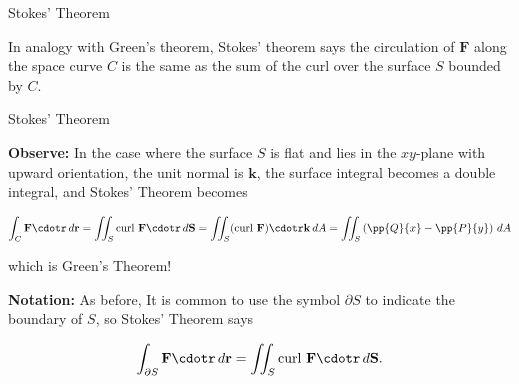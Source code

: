 \documentclass[11pt,english,
handout
]{beamer}
\begin{document}
\begin{frame}[t]{Stokes' Theorem}
\small

\pause 


%
%

\lspace
In analogy with Green's theorem, Stokes' theorem says the circulation of $\mathbf{F}$ along the space curve $C$ is the same as the sum of the curl over the surface $S$ bounded by $C$.
\end{frame}











\begin{frame}[t]{Stokes' Theorem}
\small

\textbf{Observe:} In the case where the surface $S$ is flat and lies in the $xy$-plane with upward orientation, the unit normal is $\mathbf{k}$, the surface integral becomes a double integral, and Stokes' Theorem becomes

\[
\int_C\mathbf{F}\cdotr\,d\mathbf{r}=\iint_S\text{curl }\mathbf{F}\cdotr\,d\mathbf{S}=\iint_S(\text{curl }\mathbf{F})\cdotr\mathbf{k}\,dA=\iint_S\left(\pp{Q}{x}-\pp{P}{y}\right)\,dA
\]

which is Green's Theorem!

\lspace

\textbf{Notation:} As before, It is common to use the symbol $\partial S$ to indicate the boundary of $S$, so Stokes' Theorem says 

\[
\int_{\partial S}\mathbf{F}\cdotr\,d\mathbf{r}=\iint_S\text{curl }\mathbf{F}\cdotr\,d\mathbf{S}.
\]

\end{frame}
\end{document}
